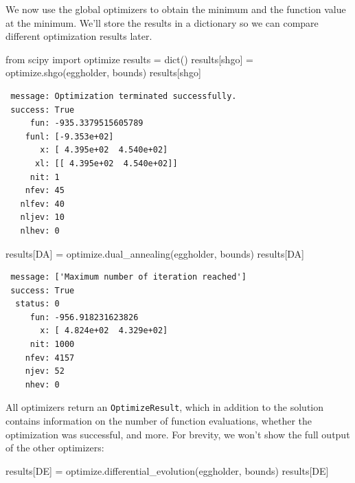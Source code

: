 \documentclass[
  letterpaper,
  DIV=11,
  numbers=noendperiod]{scrreprt}
\newenvironment{Shaded}{\begin{snugshade}}{\end{snugshade}}
\newcommand{\BuiltInTok}[1]{\textcolor[rgb]{0.00,0.23,0.31}{#1}}
\newcommand{\ImportTok}[1]{\textcolor[rgb]{0.00,0.46,0.62}{#1}}
\newcommand{\NormalTok}[1]{\textcolor[rgb]{0.00,0.23,0.31}{#1}}
\newcommand{\OperatorTok}[1]{\textcolor[rgb]{0.37,0.37,0.37}{#1}}
\newcommand{\StringTok}[1]{\textcolor[rgb]{0.13,0.47,0.30}{#1}}
\begin{document}
We now use the global optimizers to obtain the minimum and the function
value at the minimum. We'll store the results in a dictionary so we can
compare different optimization results later.

\begin{Shaded}
\begin{Highlighting}[]
\ImportTok{from}\NormalTok{ scipy }\ImportTok{import}\NormalTok{ optimize}
\NormalTok{results }\OperatorTok{=} \BuiltInTok{dict}\NormalTok{()}
\NormalTok{results[}\StringTok{\textquotesingle{}shgo\textquotesingle{}}\NormalTok{] }\OperatorTok{=}\NormalTok{ optimize.shgo(eggholder, bounds)}
\NormalTok{results[}\StringTok{\textquotesingle{}shgo\textquotesingle{}}\NormalTok{]}
\end{Highlighting}
\end{Shaded}

\begin{verbatim}
 message: Optimization terminated successfully.
 success: True
     fun: -935.3379515605789
    funl: [-9.353e+02]
       x: [ 4.395e+02  4.540e+02]
      xl: [[ 4.395e+02  4.540e+02]]
     nit: 1
    nfev: 45
   nlfev: 40
   nljev: 10
   nlhev: 0
\end{verbatim}

\begin{Shaded}
\begin{Highlighting}[]
\NormalTok{results[}\StringTok{\textquotesingle{}DA\textquotesingle{}}\NormalTok{] }\OperatorTok{=}\NormalTok{ optimize.dual\_annealing(eggholder, bounds)}
\NormalTok{results[}\StringTok{\textquotesingle{}DA\textquotesingle{}}\NormalTok{]}
\end{Highlighting}
\end{Shaded}

\begin{verbatim}
 message: ['Maximum number of iteration reached']
 success: True
  status: 0
     fun: -956.918231623826
       x: [ 4.824e+02  4.329e+02]
     nit: 1000
    nfev: 4157
    njev: 52
    nhev: 0
\end{verbatim}

All optimizers return an \texttt{OptimizeResult}, which in addition to
the solution contains information on the number of function evaluations,
whether the optimization was successful, and more. For brevity, we won't
show the full output of the other optimizers:

\begin{Shaded}
\begin{Highlighting}[]
\NormalTok{results[}\StringTok{\textquotesingle{}DE\textquotesingle{}}\NormalTok{] }\OperatorTok{=}\NormalTok{ optimize.differential\_evolution(eggholder, bounds)}
\NormalTok{results[}\StringTok{\textquotesingle{}DE\textquotesingle{}}\NormalTok{]}
\end{Highlighting}
\end{Shaded}
\end{document}
